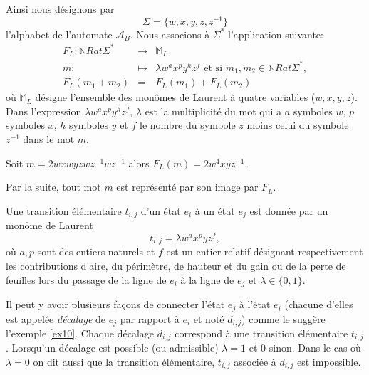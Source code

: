 Ainsi nous désignons par
$$ \Sigma = \{w,x,y,z,z^{-1}\}$$ l'alphabet de l'automate $\mathcal{A}_{B}$.
Nous associons à $\Sigma^{*}$ l'application  suivante:
\begin{eqnarray}
F_{L}: \mathbb{N}Rat\Sigma^{*} & \longrightarrow & \mathbb{M}_{L}\nonumber\\
 m:&\longmapsto & \lambda w^{a}x^{p}y^{h}z^{f} \text{ et  si }m_{1}, m_{2}\in \mathbb{N}Rat\Sigma^{*},\\
 F_{L}(m_{1}+m_{2})&=& F_{L}(m_{1})+F_{L}(m_{2})
\end{eqnarray}
où $\mathbb{M}_{L}$ désigne l'ensemble des monômes de Laurent à quatre variables ($w,x,y,z$). Dans l'expression $\lambda w^{a}x^{p}y^{h}z^{f}$, $\lambda$ est la multiplicité du mot qui a $a$ symboles $w$, $p$ symboles $x$, $h$ symboles $y$ et $f$ le nombre du symbole $z$ moins celui du symbole $z^{-1}$ dans le mot $m$. 
\begin{Ex}\label{FL}
Soit $m=2wxwyzwz^{-1}wz^{-1}$ alors $F_{L}(m)=2w^{4}xyz^{-1}$.
\end{Ex}
Par la suite, tout mot $m$ est représenté par son image par $F_{L}$.
\begin{Def}\label{defAt10}
Une transition élémentaire $t_{i,j}$ d'un état $e_{i}$ à un état $e_{j}$ est donnée par un monôme de Laurent
$$t_{i,j}= \lambda w^{a}x^{p}yz^{f}, $$
où $a,p$ sont des entiers naturels et $f$ est un entier relatif désignant respectivement les contributions d'aire, du périmètre, de hauteur et du gain ou de la perte de feuilles lors du passage de la ligne de $e_{i}$ à la ligne de $e_{j}$ et $\lambda\in \{0,1\}$.
\end{Def}
Il peut y avoir plusieurs façons de connecter l'état $e_{j}$ à l'état $e_{i}$ (chacune d'elles est appelée \emph{décalage} de $e_{j}$ par rapport à $e_{i}$  et noté $d_{i,j}$) comme le suggère l'exemple \ref{ex10}. Chaque décalage  $d_{i,j}$ correspond à une transition élémentaire $t_{i,j}$. Lorsqu'un décalage est possible (ou admissible) $\lambda=1$ et $0$ sinon. Dans le cas où $\lambda=0$ on dit aussi que la transition élémentaire, $t_{i,j}$  associée à $d_{i,j}$ est impossible.

